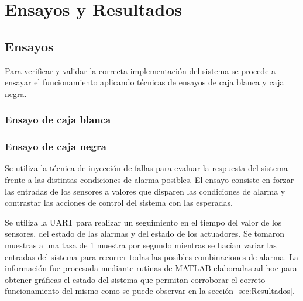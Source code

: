 
\chapter{Ensayos y Resultados} %

\label{Chapter4} %


\section{Ensayos}

Para verificar y validar la correcta implementación del sistema se procede a ensayar el funcionamiento aplicando técnicas de ensayos de caja blanca y caja negra.
\subsection{Ensayo de caja blanca}




\subsection{Ensayo de caja negra}

Se utiliza la técnica de inyección de fallas para evaluar la respuesta del sistema frente a las distintas condiciones de alarma posibles.  El ensayo consiste en forzar las entradas de los sensores a valores que disparen las condiciones de alarma y contrastar las acciones de control del sistema con las esperadas.

Se utiliza la UART para realizar un seguimiento en el tiempo del valor de los sensores, del estado de las alarmas y del estado de los actuadores. Se tomaron muestras a una tasa de 1 muestra por segundo mientras se hacían variar las entradas del sistema para recorrer todas las posibles combinaciones de alarma. La información fue procesada mediante rutinas de MATLAB elaboradas ad-hoc para obtener gráficas el estado del sistema que permitan corroborar el correto funcionamiento del mismo como se puede observar en la sección \ref{sec:Resultados}. 

